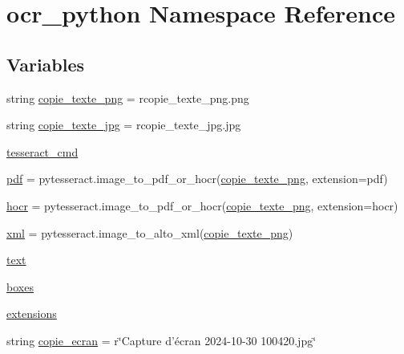 \hypertarget{namespaceocr__python}{}\section{ocr\+\_\+python Namespace Reference}
\label{namespaceocr__python}
\subsection*{Variables}
\begin{DoxyCompactItemize}
\item 
string \hyperlink{namespaceocr__python_ad4d9e12f19b02ca8c63a6c39a06d7eaf}{copie\+\_\+texte\+\_\+png} = r\textquotesingle{}copie\+\_\+texte\+\_\+png.\+png\textquotesingle{}
\item 
string \hyperlink{namespaceocr__python_a9e2247bc1e23a8f0f99465fc4263ee32}{copie\+\_\+texte\+\_\+jpg} = r\textquotesingle{}copie\+\_\+texte\+\_\+jpg.\+jpg\textquotesingle{}
\item 
\hyperlink{namespaceocr__python_a2d32b3cf2589f7d6bb2258a51aa10c30}{tesseract\+\_\+cmd}
\item 
\hyperlink{namespaceocr__python_aa792eb72c7c96aa527c680ff3c5a0cf8}{pdf} = pytesseract.\+image\+\_\+to\+\_\+pdf\+\_\+or\+\_\+hocr(\hyperlink{namespaceocr__python_ad4d9e12f19b02ca8c63a6c39a06d7eaf}{copie\+\_\+texte\+\_\+png}, extension=\textquotesingle{}pdf\textquotesingle{})
\item 
\hyperlink{namespaceocr__python_a2b74ea39e69c0b623dd1e78199ced342}{hocr} = pytesseract.\+image\+\_\+to\+\_\+pdf\+\_\+or\+\_\+hocr(\hyperlink{namespaceocr__python_ad4d9e12f19b02ca8c63a6c39a06d7eaf}{copie\+\_\+texte\+\_\+png}, extension=\textquotesingle{}hocr\textquotesingle{})
\item 
\hyperlink{namespaceocr__python_a57faf980a27f84b89e2d43f6046f976d}{xml} = pytesseract.\+image\+\_\+to\+\_\+alto\+\_\+xml(\hyperlink{namespaceocr__python_ad4d9e12f19b02ca8c63a6c39a06d7eaf}{copie\+\_\+texte\+\_\+png})
\item 
\hyperlink{namespaceocr__python_a1e093f59d752308f76c3c540793c2c7b}{text}
\item 
\hyperlink{namespaceocr__python_a8cca4b21e7797038a73222d0d790f148}{boxes}
\item 
\hyperlink{namespaceocr__python_a5244904f6594bc29e83b939e88e691f6}{extensions}
\item 
string \hyperlink{namespaceocr__python_a3142fe2875a03150128fa2055a6e801f}{copie\+\_\+ecran} = r\char`\"{}Capture d’écran 2024-\/10-\/30 100420.jpg\char`\"{}
\end{DoxyCompactItemize}


